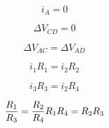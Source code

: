 \begin{equation}
i_A = 0
\end{equation}

\begin{equation}
\Delta V_{CD} = 0
\end{equation}

\begin{equation}
\Delta V_{AC} = \Delta V_{AD}
\end{equation}

\begin{equation}
i_1 R_1 = i_2 R_2
\end{equation}

\begin{equation}
i_3 R_3 = i_2 R_4
\end{equation}

\begin{equation}
\frac{R_1}{R_3} = \frac{R_2}{R_4} \\
R_1 R_4 = R_2 R_3
\end{equation}